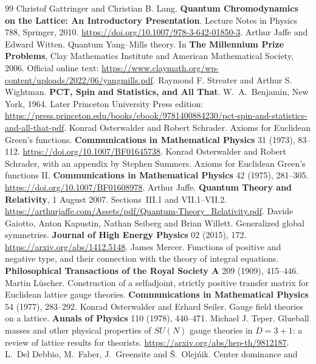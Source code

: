 \begin{thebibliography}{99}
Christof Gattringer and Christian B. Lang. \textbf{Quantum Chromodynamics on
the Lattice: An Introductory Presentation}. Lecture Notes in Physics 788,
Springer, 2010. \url{https://doi.org/10.1007/978-3-642-01850-3}.
Arthur Jaffe and Edward Witten. Quantum Yang--Mills theory. In \textbf{The
Millennium Prize Problems}, Clay Mathematics Institute and American
Mathematical Society, 2006. Official online text:
\url{https://www.claymath.org/wp-content/uploads/2022/06/yangmills.pdf}.
Raymond F. Streater and Arthur S. Wightman.
\textbf{PCT, Spin and Statistics, and All That}.
W.~A.~Benjamin, New York, 1964. Later Princeton University Press edition:
\url{https://press.princeton.edu/books/ebook/9781400884230/pct-spin-and-statistics-and-all-that-pdf}.
Konrad Osterwalder and Robert Schrader. Axioms for Euclidean Green's
functions. \textbf{Communications in Mathematical Physics} 31 (1973),
83--112. \url{https://doi.org/10.1007/BF01645738}.
Konrad Osterwalder and Robert Schrader, with an appendix by Stephen Summers.
Axioms for Euclidean Green's functions II.
\textbf{Communications in Mathematical Physics} 42 (1975), 281--305.
\url{https://doi.org/10.1007/BF01608978}.
Arthur Jaffe. \textbf{Quantum Theory and Relativity}, 1 August 2007.
Sections~III.1 and VII.1--VII.2.
\url{https://arthurjaffe.com/Assets/pdf/Quantum-Theory_Relativity.pdf}.
Davide Gaiotto, Anton Kapustin, Nathan Seiberg and Brian Willett.
Generalized global symmetries. \textbf{Journal of High Energy Physics}
02 (2015), 172. \url{https://arxiv.org/abs/1412.5148}.
James Mercer. Functions of positive and negative type, and their connection
with the theory of integral equations. \textbf{Philosophical Transactions of
the Royal Society A} 209 (1909), 415--446.
Martin L\"uscher. Construction of a selfadjoint, strictly positive transfer
matrix for Euclidean lattice gauge theories. \textbf{Communications in
Mathematical Physics} 54 (1977), 283--292.
Konrad Osterwalder and Erhard Seiler. Gauge field theories on a lattice.
\textbf{Annals of Physics} 110 (1978), 440--471.
Michael J. Teper. Glueball masses and other physical properties of $SU(N)$
gauge theories in $D=3+1$: a review of lattice results for theorists.
\url{https://arxiv.org/abs/hep-th/9812187}.
L.~Del Debbio, M.~Faber, J.~Greensite and \v{S}.~Olej\'nik. Center dominance and

\end{thebibliography}

